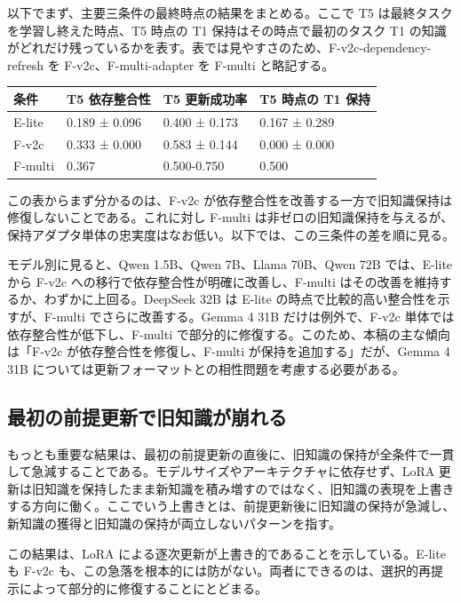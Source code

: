 \documentclass[12pt,a4paper]{article}
\begin{document}
以下でまず、主要三条件の最終時点の結果をまとめる。ここで T5 は最終タスクを学習し終えた時点、T5 時点の T1 保持はその時点で最初のタスク T1 の知識がどれだけ残っているかを表す。表では見やすさのため、F-v2c-dependency-refresh を F-v2c、F-multi-adapter を F-multi と略記する。

{\def\LTcaptype{table} %
\begin{longtable}[]{@{}llll@{}}
\toprule\noalign{}
条件 & T5 依存整合性 & T5 更新成功率 & T5 時点の T1 保持 \\
\midrule\noalign{}
\endhead
\bottomrule\noalign{}
\endlastfoot
E-lite & 0.189 ± 0.096 & 0.400 ± 0.173 & 0.167 ± 0.289 \\
F-v2c & 0.333 ± 0.000 & 0.583 ± 0.144 & 0.000 ± 0.000 \\
F-multi & 0.367 & 0.500-0.750 & 0.500 \\
\end{longtable}
}

この表からまず分かるのは、F-v2c が依存整合性を改善する一方で旧知識保持は修復しないことである。これに対し F-multi は非ゼロの旧知識保持を与えるが、保持アダプタ単体の忠実度はなお低い。以下では、この三条件の差を順に見る。

モデル別に見ると、Qwen 1.5B、Qwen 7B、Llama 70B、Qwen 72B では、E-lite から F-v2c への移行で依存整合性が明確に改善し、F-multi はその改善を維持するか、わずかに上回る。DeepSeek 32B は E-lite の時点で比較的高い整合性を示すが、F-multi でさらに改善する。Gemma 4 31B だけは例外で、F-v2c 単体では依存整合性が低下し、F-multi で部分的に修復する。このため、本稿の主な傾向は「F-v2c が依存整合性を修復し、F-multi が保持を追加する」だが、Gemma 4 31B については更新フォーマットとの相性問題を考慮する必要がある。

\subsection{最初の前提更新で旧知識が崩れる}\label{ux6700ux521dux306eux524dux63d0ux66f4ux65b0ux3067ux65e7ux77e5ux8b58ux304cux5d29ux308cux308b}

もっとも重要な結果は、最初の前提更新の直後に、旧知識の保持が全条件で一貫して急減することである。モデルサイズやアーキテクチャに依存せず、LoRA 更新は旧知識を保持したまま新知識を積み増すのではなく、旧知識の表現を上書きする方向に働く。ここでいう上書きとは、前提更新後に旧知識の保持が急減し、新知識の獲得と旧知識の保持が両立しないパターンを指す。

この結果は、LoRA による逐次更新が上書き的であることを示している。E-lite も F-v2c も、この急落を根本的には防がない。両者にできるのは、選択的再提示によって部分的に修復することにとどまる。
\end{document}
